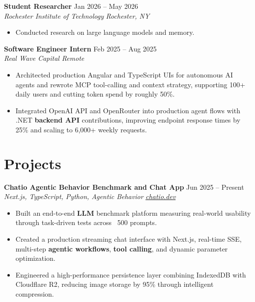 \documentclass[10pt,letterpaper]{article}
\newif\ifresumeFirstRole
\newcommand{\resumeRole}[4]{%
  \ifresumeFirstRole
    \global\resumeFirstRolefalse
  \else
    \vspace{0pt plus 1fill}%
  \fi
  \textbf{#1} \hfill #2\\
  \textit{#3} \hfill \textit{#4}
}
\begin{document}
\resumeRole{Student Researcher}{Jan 2026 -- May 2026}{Rochester Institute of Technology}{Rochester, NY}
\begin{itemize}
  \item Conducted research on large language models and memory.
\end{itemize}

\resumeRole{Software Engineer Intern}{Feb 2025 -- Aug 2025}{Real Wave Capital}{Remote}
\begin{itemize}
  \item Architected production Angular and TypeScript UIs for autonomous AI agents and rewrote MCP tool-calling and context strategy, supporting 100+ daily users and cutting token spend by roughly 50\%.
  \item Integrated OpenAI API and OpenRouter into production agent flows with .NET \textbf{backend API} contributions, improving endpoint response times by 25\% and scaling to 6,000+ weekly requests.
\end{itemize}

\section*{Projects}
\resumeRole{Chatio Agentic Behavior Benchmark and Chat App}{Jun 2025 -- Present}{Next.js, TypeScript, Python, Agentic Behavior}{\href{https://chatio.dev}{chatio.dev}}
\begin{itemize}
  \item Built an end-to-end \textbf{LLM} benchmark platform measuring real-world usability through task-driven tests across ~500 prompts.
  \item Created a production streaming chat interface with Next.js, real-time SSE, multi-step \textbf{agentic workflows}, \textbf{tool calling}, and dynamic parameter optimization.
  \item Engineered a high-performance persistence layer combining IndexedDB with Cloudflare R2, reducing image storage by 95\% through intelligent compression.
\end{itemize}
\end{document}
